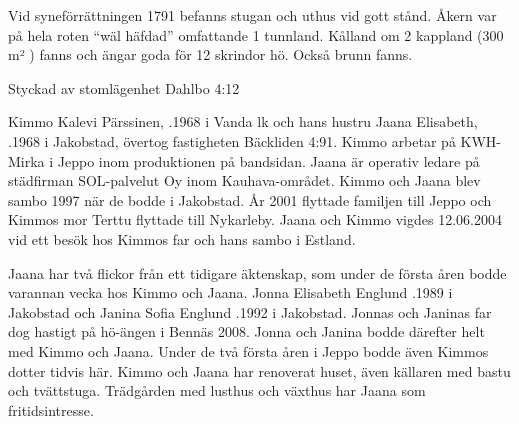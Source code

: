 Vid  syneförrättningen 1791 befanns stugan och uthus vid gott stånd. Åkern var på hela roten ``wäl häfdad'' omfattande 1 tunnland. Kålland om 2 kappland (300 m² ) fanns och ängar goda för 12 skrindor hö. Också brunn fanns.




Styckad av stomlägenhet Dahlbo 4:12


Kimmo Kalevi Pärssinen, .1968 i Vanda lk och hans hustru Jaana Elisabeth, .1968 i Jakobstad, övertog fastigheten Bäckliden 4:91. Kimmo arbetar på KWH-Mirka i Jeppo inom 	produktionen på bandsidan. Jaana är operativ ledare på städfirman SOL-palvelut Oy inom Kauhava-området. Kimmo och Jaana blev sambo 1997 när de bodde i Jakobstad. År 2001 flyttade familjen till Jeppo och Kimmos mor Terttu flyttade till Nykarleby. Jaana och Kimmo vigdes 12.06.2004 vid ett besök hos Kimmos far och hans sambo i Estland.
\begin{jhchildren}
  \item {}
  \item {}
  \item {}
  \item {}
\end{jhchildren}
Jaana har två flickor från ett tidigare äktenskap, som under de första åren bodde varannan vecka hos Kimmo och Jaana. Jonna Elisabeth Englund	.1989 i Jakobstad	och	Janina Sofia Englund	.1992 i Jakobstad.	Jonnas och Janinas far dog hastigt på hö-ängen i Bennäs 2008. Jonna och Janina bodde därefter helt med Kimmo och Jaana.	Under de två första åren i Jeppo bodde även Kimmos dotter tidvis här. Kimmo och Jaana har renoverat huset, även källaren med bastu och	tvättstuga. Trädgården med lusthus och växthus har Jaana som fritidsintresse.


